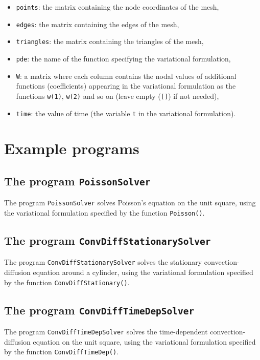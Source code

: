 \documentclass[12pt]{article}
\begin{document}
\begin{itemize}
\item \texttt{points}:    the matrix containing the node coordinates of the mesh,
\item \texttt{edges}:     the matrix containing the edges of the mesh,
\item \texttt{triangles}: the matrix containing the triangles of the mesh,
\item \texttt{pde}:       the name of the function specifying the variational formulation,
\item \texttt{W}:         a matrix where each column contains the nodal values of additional functions (coefficients) appearing in the
                          variational formulation as the functions \texttt{w(1)}, \texttt{w(2)} and so on (leave empty (\texttt{[]}) if not needed),
\item \texttt{time}:      the value of time (the variable \texttt{t} in the variational formulation).
\end{itemize}

\cleardoublepage
\section{Example programs}

\subsection{The program \texttt{PoissonSolver}}

The program \texttt{PoissonSolver} solves Poisson's equation on the unit square,
using the variational formulation specified by the function \texttt{Poisson()}.

\subsection{The program \texttt{ConvDiffStationarySolver}}

The program \texttt{ConvDiffStationarySolver} solves the stationary convection-diffusion equation around a cylinder,
using the variational formulation specified by the function \texttt{ConvDiffStationary()}.

\subsection{The program \texttt{ConvDiffTimeDepSolver}}

The program \texttt{ConvDiffTimeDepSolver} solves the time-dependent convection-diffusion equation on the unit square,
using the variational formulation specified by the function \texttt{ConvDiffTimeDep()}.
\end{document}
